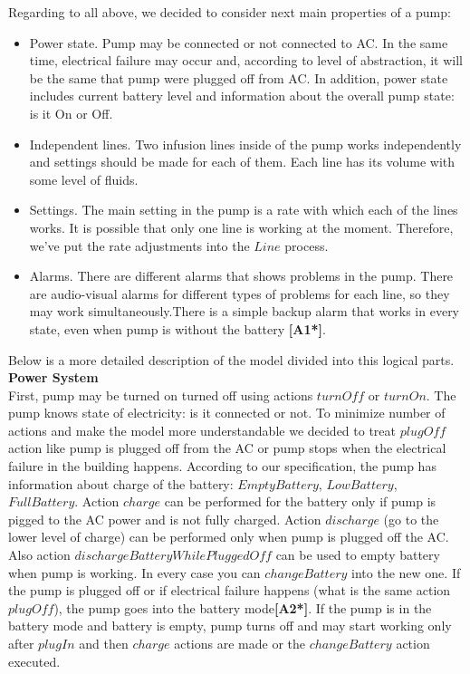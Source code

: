 \documentclass{article}
\begin{document}
Regarding to all above, we decided to consider next main properties of a pump: \\
\begin{itemize}
\item Power state. Pump may be connected or not connected to AC. In the same time, electrical failure may occur and, according to level of abstraction, it will be the same that pump were plugged off from AC. In addition, power state includes current battery level and information about the overall pump state: is it On or Off.
\item Independent lines. Two infusion lines inside of the pump works independently and settings should be made for each of them. Each line has its volume with some level of fluids. 
\item Settings. The main setting in the pump is a rate with which each of the lines works. It is possible that only one line is working at the moment. Therefore, we’ve put the rate adjustments into the $Line$ process.
\item Alarms. There are different alarms that shows problems in the pump. There are audio-visual alarms for different types of problems for each line, so they may work simultaneously.There is a simple backup alarm that works in every state, even when pump is without the battery  \textbf{[A1*]}.
\end{itemize}
Below is a more detailed description of the model divided into this logical parts.\\

\textbf{Power System} \\

First, pump may be turned on turned off using actions $turnOff$ or $turnOn$. The pump knows state of electricity: is it connected or not. To minimize number of actions and make the model more understandable we decided to treat $plugOff$ action like pump is plugged off from the AC or pump stops when the electrical failure in the building happens.
According to our specification, the pump has information about charge of the battery: $EmptyBattery$, $LowBattery$, $FullBattery$. Action $charge$ can be performed for the battery only if pump is pigged to the AC power and is not fully charged. Action $discharge$ (go to the lower level of charge) can be performed only when pump is plugged off the AC. Also action $dischargeBatteryWhilePluggedOff$ can be used to empty battery when pump is working. In every case you can $changeBattery$ into the new one.
If the pump is plugged off or if electrical failure happens (what is the same action $plugOff$), the pump goes into the battery mode\textbf{[A2*]}.
If the pump is in the battery mode and battery is empty, pump turns off and may start working only after $plugIn$ and then $charge$ actions are made or the $changeBattery$ action executed.\\
\end{document}
